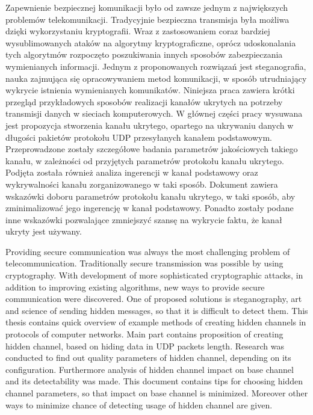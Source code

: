 \documentclass[a4paper, twoside, 12pt]{report}
\newenvironment{abstractpage}
  {\vspace*{\fill}\thispagestyle{empty}}
    {\vfill}
\renewenvironment{abstract}[1]
      {\bigskip\selectlanguage{#1}%
             \begin{center}\bfseries\abstractname\end{center}}
           {\par\bigskip}
\begin{document}



\begin{abstractpage}
\begin{abstract}{polish}
    Zapewnienie bezpiecznej komunikacji było od zawsze jednym z największych
    problemów telekomunikacji. Tradycyjnie bezpieczna transmisja była możliwa
    dzięki wykorzystaniu kryptografii. Wraz z zastosowaniem coraz bardziej wysublimowanych
    ataków na algorytmy kryptograficzne, oprócz udoskonalania tych algorytmów rozpoczęto
    poszukiwania innych sposobów zabezpieczania wymienianych informacji. Jednym
    z proponowanych rozwiązań jest steganografia, nauka zajmująca się opracowywaniem
    metod komunikacji, w sposób utrudniający wykrycie istnienia wymienianych komunikatów.
    Niniejsza praca zawiera krótki przegląd przykładowych sposobów
    realizacji kanałów ukrytych na potrzeby transmisji danych w sieciach komputerowych.
    W głównej części pracy wysuwana jest propozycja stworzenia kanału ukrytego, opartego na ukrywaniu
    danych w długości pakietów protokołu UDP przesyłanych kanałem podstawowym.
    Przeprowadzone
    zostały szczegółowe badania parametrów jakościowych takiego kanału, w zależności
    od przyjętych parametrów protokołu kanału ukrytego. Podjęta została również
    analiza ingerencji w kanał podstawowy oraz wykrywalności kanału zorganizowanego w taki sposób.
    Dokument zawiera wskazówki doboru parametrów protokołu kanału ukrytego, w taki sposób, aby
    zminimalizować jego ingerencję w kanał podstawowy. Ponadto zostały podane inne
    wskazówki pozwalające zmniejszyć szansę na wykrycie faktu, że kanał ukryty jest
    używany.
\end{abstract}

\begin{abstract}{english}
    Providing secure communication was always the most challenging problem
    of telecommunication. Traditionally secure transmission was possible by
    using cryptography. With development of more sophisticated cryptographic attacks,
    in addition to improving existing algorithms, new ways to provide secure communication
    were discovered. One of proposed solutions is steganography, art and science
    of sending hidden messages, so that it is difficult to detect them. This thesis
    contains quick overview of example methods of creating hidden channels in
    protocols of computer networks. Main part contains proposition of creating
    hidden channel, based on hiding data in UDP packets length. Research was
    conducted to find out quality parameters of hidden channel, depending on
    its configuration. Furthermore analysis of hidden channel impact on base channel
    and its detectability was made. This document contains tips for choosing hidden
    channel parameters, so that impact on base channel is minimized. Moreover
    other ways to minimize chance of detecting usage of hidden channel are given.
\end{abstract}
\end{abstractpage}
\end{document}
